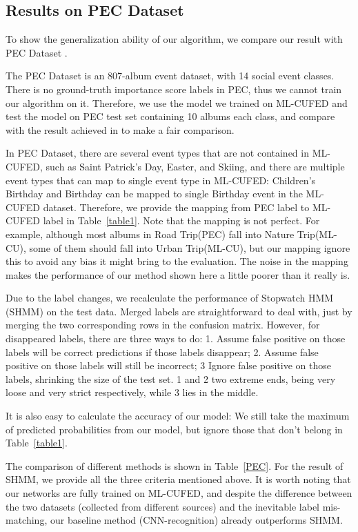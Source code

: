 \documentclass[runningheads]{llncs}
\begin{document}
\subsection{Results on PEC Dataset}
\label{PEC_section}
To show the generalization ability of our algorithm, we compare our result with PEC Dataset \cite{HMM}.

The PEC Dataset is an 807-album event dataset, with 14 social event classes. There is no ground-truth importance score labels in PEC, thus we cannot train our algorithm on it. Therefore, we use the model we trained on ML-CUFED and test the model on PEC test set containing 10 albums each class, and compare with the result achieved in \cite{HMM} to make a fair comparison.

In PEC Dataset, there are several event types that are not contained in ML-CUFED, such as Saint Patrick's Day, Easter, and Skiing, and there are multiple event types that can map to single event type in ML-CUFED: Children's Birthday and Birthday can be mapped to single Birthday event in the ML-CUFED dataset. Therefore, we provide the mapping from PEC label to ML-CUFED label in Table~\ref{table1}. Note that the mapping is not perfect. For example, although most albums in Road Trip(PEC) fall into Nature Trip(ML-CU), some of them should fall into Urban Trip(ML-CU), but our mapping ignore this to avoid any bias it might bring to the evaluation. The noise in the mapping makes the performance of our method shown here a little poorer than it really is.

Due to the label changes, we recalculate the performance of Stopwatch HMM (SHMM) \cite{HMM} on the test data. Merged labels are straightforward to deal with, just by merging the two corresponding rows in the confusion matrix. However, for disappeared labels, there are three ways to do: 1. Assume false positive on those labels will be correct predictions if those labels disappear; 2. Assume false positive on those labels will still be incorrect; 3 Ignore false positive on those labels, shrinking the size of the test set. 1 and 2 two extreme ends, being very loose and very strict respectively, while 3 lies in the middle. 

It is also easy to calculate the accuracy of our model: We still take the maximum of predicted probabilities from our model, but ignore those that don't belong in Table~\ref{table1}.

The comparison of different methods is shown in Table~\ref{PEC}. For the result of SHMM, we provide all the three criteria mentioned above. It is worth noting that our networks are fully trained on ML-CUFED, and despite the difference between the two datasets (collected from different sources) and the inevitable label mis-matching, our baseline method (CNN-recognition) already outperforms SHMM. 
\end{document}
